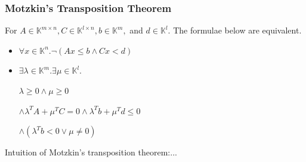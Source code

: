 \documentclass[11pt]{beamer}
\begin{document}
\begin{frame}\frametitle{Motzkin's Transposition Theorem}
\begin{theorem}
For $A\in \mathbb{K}^{m\times n}, C\in \mathbb{K}^{l\times n}, b\in \mathbb{K}^m, $ and $d\in \mathbb{K}^l$. The formulae below are equivalent.
\begin{itemize}
\item $\forall x \in \mathbb{K}^n. \neg (Ax\le b \wedge Cx < d)$

\item $\exists \lambda \in \mathbb{K}^m. \exists \mu \in \mathbb{K}^l.$

$\lambda \ge 0 \wedge \mu \ge 0$

$\wedge \lambda^{T}A + \mu^TC = 0 \wedge \lambda^{T}b + \mu^Td \le 0 $

$\wedge (\lambda^Tb < 0 \vee \mu \ne 0)$

\end{itemize}
\end{theorem}


Intuition of Motzkin's transposition theorem:...
\end{frame}
\end{document}
